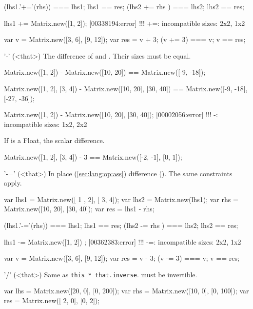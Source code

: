 \begin{urbiscriptapi}
\begin{urbiassert}
(lhs1.'+='(rhs)) === lhs1;  lhs1 == res;
(lhs2  +=  rhs ) === lhs2;  lhs2 == res;

lhs1 += Matrix.new([1, 2]);
[00338194:error] !!! +=: incompatible sizes: 2x2, 1x2
\end{urbiassert}

\begin{urbiassert}
var v = Matrix.new([3, 6], [9, 12]);
var res = v + 3;
(v += 3) === v; v == res;
\end{urbiassert}


\item['-'](<that>)%
  The difference of \this and \that.  Their sizes must be equal.
\begin{urbiassert}
Matrix.new([1, 2]) - Matrix.new([10, 20])
  == Matrix.new([-9, -18]);

Matrix.new([1, 2], [3, 4]) - Matrix.new([10, 20], [30, 40])
  == Matrix.new([-9, -18], [-27, -36]);

Matrix.new([1, 2]) - Matrix.new([10, 20], [30, 40]);
[00002056:error] !!! -: incompatible sizes: 1x2, 2x2
\end{urbiassert}

  If \that is a Float, the scalar difference.
\begin{urbiassert}
Matrix.new([1, 2], [3, 4]) - 3 == Matrix.new([-2, -1], [0, 1]);
\end{urbiassert}



\item['-='](<that>)%
  In place (\autoref{sec:lang:op:ass}) difference ().  The same
  constraints apply.
\begin{urbiassert}
var lhs1 = Matrix.new([ 1 , 2], [ 3,  4]);
var lhs2 = Matrix.new(lhs1);
var rhs = Matrix.new([10, 20], [30, 40]);
var res = lhs1 - rhs;

(lhs1.'-='(rhs)) === lhs1;  lhs1 == res;
(lhs2  -=  rhs ) === lhs2;  lhs2 == res;

lhs1 -= Matrix.new([1, 2]) ;
[00362383:error] !!! -=: incompatible sizes: 2x2, 1x2
\end{urbiassert}

\begin{urbiassert}
var v = Matrix.new([3, 6], [9, 12]);
var res = v - 3;
(v -= 3) === v; v == res;
\end{urbiassert}


\item['/'](<that>)%
  Same as \lstinline|this * that.inverse|.  \that must be invertible.
\begin{urbiassert}
var lhs = Matrix.new([20, 0], [0, 200]);
var rhs = Matrix.new([10, 0], [0, 100]);
var res = Matrix.new([ 2, 0], [0,   2]);


\end{urbiassert}
\end{urbiscriptapi}
